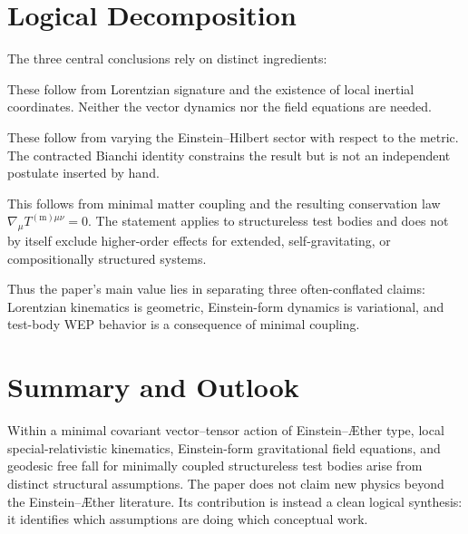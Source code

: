 \documentclass[12pt,a4paper]{article}
\newcommand{\AEther}{\AE{}ther}
\begin{document}
    \section{Logical Decomposition}
        \label{sec:logic}
        
        The three central conclusions rely on distinct ingredients:
        
        \begin{description}[leftmargin=2.2em, labelsep=0.8em]
\item[Local SR kinematics.]
These follow from Lorentzian signature and the existence of local inertial
coordinates. Neither the vector dynamics nor the field equations are needed.

\item[Einstein-form field equations.]
These follow from varying the Einstein--Hilbert sector with respect to the
metric. The contracted Bianchi identity constrains the result but is not an
independent postulate inserted by hand.

\item[Geodesic free fall in the test-body limit.]
This follows from minimal matter coupling and the resulting conservation law
$\nabla_\mu T^{(\mathrm m)\mu\nu}=0$. The statement applies to structureless
test bodies and does not by itself exclude higher-order effects for extended,
self-gravitating, or compositionally structured systems.
        \end{description}
        
        Thus the paper's main value lies in separating three often-conflated claims:
        Lorentzian kinematics is geometric, Einstein-form dynamics is variational, and
        test-body WEP behavior is a consequence of minimal coupling.
    
    \section{Summary and Outlook}
        \label{sec:summary}
        
        Within a minimal covariant vector--tensor action of Einstein--\AEther{} type,
        local special-relativistic kinematics, Einstein-form gravitational field
        equations, and geodesic free fall for minimally coupled structureless test
        bodies arise from distinct structural assumptions. The paper does not claim new
        physics beyond the Einstein--\AEther{} literature. Its contribution is instead a
        clean logical synthesis: it identifies which assumptions are doing which
        conceptual work.
        
\end{document}
